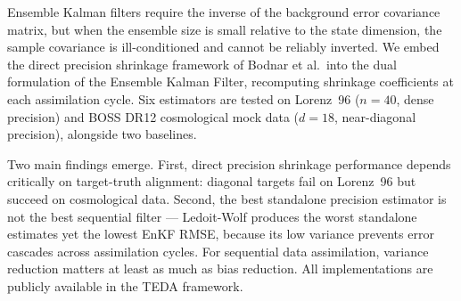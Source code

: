 \begin{thesis-abstract}

Ensemble Kalman filters require the inverse of the background error covariance matrix, but when the ensemble size is small relative to the state dimension, the sample covariance is ill-conditioned and cannot be reliably inverted. We embed the direct precision shrinkage framework of Bodnar et al.\ into the dual formulation of the Ensemble Kalman Filter, recomputing shrinkage coefficients at each assimilation cycle. Six estimators are tested on Lorenz~96 ($n=40$, dense precision) and BOSS DR12 cosmological mock data ($d=18$, near-diagonal precision), alongside two baselines.

Two main findings emerge. First, direct precision shrinkage performance depends critically on target-truth alignment: diagonal targets fail on Lorenz~96 but succeed on cosmological data. Second, the best standalone precision estimator is not the best sequential filter --- Ledoit-Wolf produces the worst standalone estimates yet the lowest EnKF RMSE, because its low variance prevents error cascades across assimilation cycles. For sequential data assimilation, variance reduction matters at least as much as bias reduction. All implementations are publicly available in the TEDA framework.

\end{thesis-abstract}
